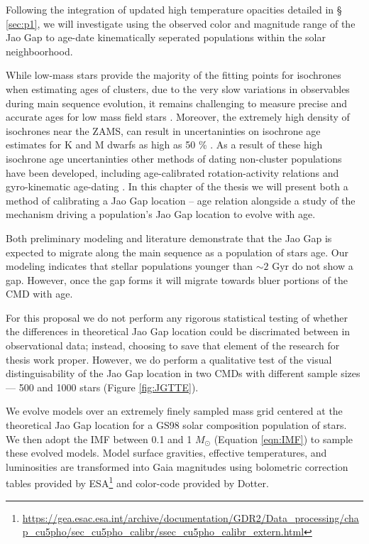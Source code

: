 Following the integration of updated high temperature opacities detailed in \S
\ref{sec:p1}, we will investigate using the observed color and magnitude range
of the Jao Gap to age-date kinematically seperated populations within the solar
neighboorhood.

While low-mass stars provide the majority of the fitting points for isochrones
when estimating ages of clusters, due to the very slow variations in
observables during main sequence evolution, it remains challenging to measure
precise and accurate ages for low mass field stars \citep{Soderblom2010,
Veyette2018, Kiman2021}. Moreover, the extremely high density of isochrones
near the ZAMS, can result in uncertaninties on isochrone age estimates for K
and M dwarfs as high as 50 \% \citep{Lu2021}. As a result of these high
isochrone age uncertaninties other methods of dating non-cluster populations
have been developed, including age-calibrated rotation-activity relations
\citep[e.g.][]{Kiman2021} and gyro-kinematic age-dating \citep[e.g.][]{Lu2021}.
In this chapter of the thesis we will present both a method of calibrating a
Jao Gap location -- age relation alongside a study of the mechanism driving a
population's Jao Gap location to evolve with age.

Both preliminary modeling and literature
\citep[e.g.][]{Jao2018,Jao2020,Feiden2021,Mansfield2021} demonstrate that the
Jao Gap is expected to migrate along the main sequence as a population of stars
age. Our modeling indicates that stellar populations younger than $\sim 2$ Gyr
do not show a gap. However, once the gap forms it will migrate towards bluer
portions of the CMD with age.

For this proposal we do not perform any rigorous statistical testing of whether
the differences in theoretical Jao Gap location could be discrimated between in
observational data; instead, choosing to save that element of the research for
thesis work proper. However, we do perform a qualitative test of the visual
distinguisability of the Jao Gap location in two CMDs with different sample
sizes --- 500 and 1000 stars (Figure \ref{fig:JGTTE}).

We evolve models over an extremely finely sampled mass grid centered at the
theoretical Jao Gap location for a GS98 solar composition population of stars.
We then adopt the \citep{Sollima2019} IMF between 0.1 and 1 $M_{\odot}$
(Equation \ref{eqn:IMF}) to sample these evolved models. Model surface
gravities, effective temperatures, and luminosities are transformed into Gaia
magnitudes using bolometric correction tables provided by
ESA\footnote{\url{https://gea.esac.esa.int/archive/documentation/GDR2/Data\_processing/chap\_cu5pho/sec\_cu5pho\_calibr/ssec\_cu5pho\_calibr\_extern.html}}
and color-code provided by Dotter. 

